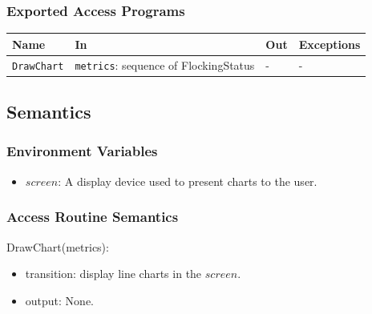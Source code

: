 \documentclass[12pt, titlepage]{article}
\begin{document}
\subsubsection{Exported Access Programs}

\begin{center}
\begin{tabular}{p{4cm} p{4cm} p{4cm} p{2cm}}
\hline
\textbf{Name} & \textbf{In} & \textbf{Out} & \textbf{Exceptions} \\
\hline
\texttt{DrawChart} & \texttt{metrics}: sequence of FlockingStatus & - & - \\
\hline
\end{tabular}
\end{center}

\subsection{Semantics}

\subsubsection{Environment Variables}
\begin{itemize}
\item $screen$: A display device used to present charts to the user. 
\end{itemize}

\subsubsection{Access Routine Semantics}

\noindent DrawChart(metrics):
\begin{itemize}
\item transition: display line charts in the $screen$.
\item output: None.
\end{itemize}






\end{document}
